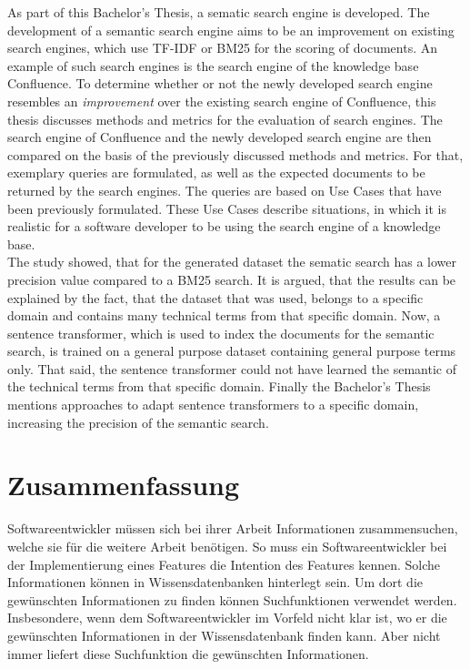 As part of this Bachelor's Thesis, a sematic search engine is developed.
The development of a semantic search engine aims to be an improvement on existing search engines, which use TF-IDF or BM25 for the scoring of documents.
An example of such search engines is the search engine of the knowledge base Confluence.
To determine whether or not the newly developed search engine resembles an \textit{improvement} over the existing search engine of Confluence, this thesis discusses methods and metrics for the evaluation of search engines.
The search engine of Confluence and the newly developed search engine are then compared on the basis of the previously discussed methods and metrics.
For that, exemplary queries are formulated, as well as the expected documents to be returned by the search engines.
The queries are based on Use Cases that have been previously formulated.
These Use Cases describe situations, in which it is realistic for a software developer to be using the search engine of a knowledge base.\\

The study showed, that for the generated dataset the sematic search has a lower precision value compared to a BM25 search.
It is argued, that the results can be explained by the fact, that the dataset that was used, belongs to a specific domain and contains many technical terms from that specific domain.
Now, a sentence transformer, which is used to index the documents for the semantic search, is trained on a general purpose dataset containing general purpose terms only.
That said, the sentence transformer could not have learned the semantic of the technical terms from that specific domain.
Finally the Bachelor's Thesis mentions approaches to adapt sentence transformers to a specific domain, increasing the precision of the semantic search.

\section*{Zusammenfassung}
Softwareentwickler müssen sich bei ihrer Arbeit Informationen zusammensuchen, welche sie für die weitere Arbeit benötigen.
So muss ein Softwareentwickler bei der Implementierung eines Features die Intention des Features kennen.
Solche Informationen können in Wissensdatenbanken hinterlegt sein.
Um dort die gewünschten Informationen zu finden können Suchfunktionen verwendet werden.
Insbesondere, wenn dem Softwareentwickler im Vorfeld nicht klar ist, wo er die gewünschten Informationen in der Wissensdatenbank finden kann.
Aber nicht immer liefert diese Suchfunktion die gewünschten Informationen.\\

